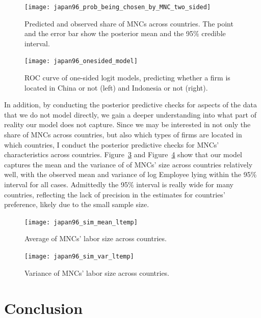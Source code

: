 \begin{figure}[!ht] \centering
\texttt{[image: japan96\_prob\_being\_chosen\_by\_MNC\_two\_sided]}
  \caption[Predicted and observed MNCs' distribution across Asia.]{Predicted and
    observed share of MNCs across countries. The point and the error
bar show the posterior mean and the 95\% credible interval.}
  \label{fig:japan96_prob_being_chosen_by_MNC_two_sided}
\end{figure}

\begin{figure}[!ht] \centering
\texttt{[image: japan96\_onesided\_model]}
  \caption[ROC curve for one-sided logit models.]{ROC curve of one-sided logit
    models, predicting whether a firm is located in China or not (left) and
    Indonesia or not (right).}
  \label{fig:japan96_onesided_model}
\end{figure}

In addition, by conducting the posterior predictive checks for aspects of the
data that we do not model directly, we gain a deeper understanding into what
part of reality our model does not capture. Since we may be interested in
not only the share of MNCs across countries, but also which types of firms are
located in which countries, I conduct the posterior predictive checks for MNCs'
characteristics across countries. Figure~\ref{fig:japan96_sim_mean_ltemp} and
Figure~\ref{fig:japan96_sim_var_ltemp} show that our model captures the mean
and the variance of of MNCs' size across countries relatively well, with the
observed mean and variance of log Employee lying within the 95\% interval for all cases.
Admittedly the 95\% interval is really wide for many countries, reflecting the
lack of precision in the estimates for countries' preference, likely due to the
small sample size.

\begin{figure}[!ht] \centering
\texttt{[image: japan96\_sim\_mean\_ltemp]}
  \caption[Predicted and observed MNCs' size across countries.]{Average of MNCs' labor size across countries.}
  \label{fig:japan96_sim_mean_ltemp}
\end{figure}

\begin{figure}[!ht] \centering
\texttt{[image: japan96\_sim\_var\_ltemp]}
  \caption[Predicted and observed variance of MNCs' size across countries.]{Variance of MNCs' labor size across countries.}
  \label{fig:japan96_sim_var_ltemp}
\end{figure}

\section{Conclusion}

